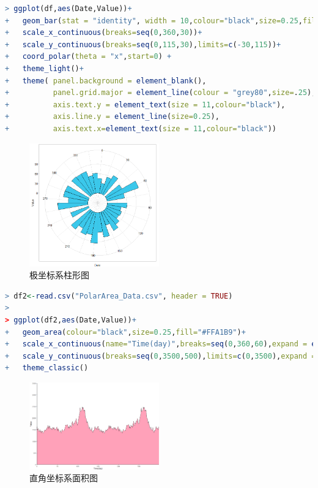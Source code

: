 \documentclass[11pt,a4paper,oneside]{book}
\begin{document}
\begin{lstlisting}[language=r]
> ggplot(df,aes(Date,Value))+
+   geom_bar(stat = "identity", width = 10,colour="black",size=0.25,fill="#3BC8EB")+
+   scale_x_continuous(breaks=seq(0,360,30))+
+   scale_y_continuous(breaks=seq(0,115,30),limits=c(-30,115))+
+   coord_polar(theta = "x",start=0) +
+   theme_light()+
+   theme( panel.background = element_blank(),
+          panel.grid.major = element_line(colour = "grey80",size=.25),
+          axis.text.y = element_text(size = 11,colour="black"),
+          axis.line.y = element_line(size=0.25),
+          axis.text.x=element_text(size = 11,colour="black"))
\end{lstlisting}
\begin{figure}[H]
	\centering
	\includegraphics[width=0.5\textwidth]{screenshot001}
	\caption{极坐标系柱形图}
	\label{fig:screenshot001}
\end{figure}

\begin{lstlisting}[language=r]
> df2<-read.csv("PolarArea_Data.csv", header = TRUE)
> 
> ggplot(df2,aes(Date,Value))+
+   geom_area(colour="black",size=0.25,fill="#FFA1B9")+
+   scale_x_continuous(name="Time(day)",breaks=seq(0,360,60),expand = expand_scale(add = 0))+
+   scale_y_continuous(breaks=seq(0,3500,500),limits=c(0,3500),expand = expand_scale(add = 0))+
+   theme_classic()
\end{lstlisting}
\begin{figure}[H]
	\centering
	\includegraphics[width=0.5\textwidth]{screenshot002}
	\caption{直角坐标系面积图}
	\label{fig:screenshot002}
\end{figure}
\end{document}
